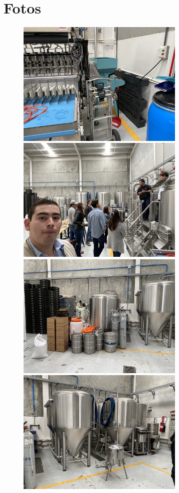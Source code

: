 \documentclass{article}
\begin{document}
\section{Fotos}
\begin{figure}[htbp]
    \centering
    \includegraphics[width=8cm]{./img/IMG-7090.JPG}
    \includegraphics[width=8cm]{./img/IMG-7091.JPG}
    \includegraphics[width=8cm]{./img/IMG-7092.JPG}
    \includegraphics[width=8cm]{./img/IMG-7093.JPG}

\end{figure}
\end{document}
